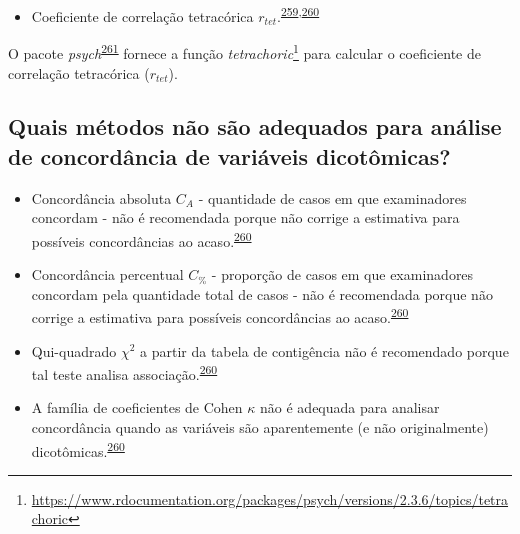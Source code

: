 \documentclass[
  a4paper,
]{book}
\providecommand{\tightlist}{%
  \setlength{\itemsep}{0pt}\setlength{\parskip}{0pt}}
\renewcommand{\href}[2]{#2\footnote{\url{#1}}}
\newenvironment{infobox}[1]
  {
  \begin{itemize}
  \renewcommand{\labelitemi}{
    \raisebox{-.7\height}[0pt][0pt]{
      {\setkeys{Gin}{width=3em,keepaspectratio}
        \texttt{[image: \#1]}}
    }
  }
  \setlength{\fboxsep}{1em}
  \begin{blackbox}
  \item
  }
  {
  \end{blackbox}
  \end{itemize}
  }
\begin{document}
\begin{itemize}
\tightlist
\item
  Coeficiente de correlação tetracórica \(r_{tet}\).\textsuperscript{\protect\hyperlink{ref-i.mathe1901}{259},\protect\hyperlink{ref-banerjee1999}{260}}
\end{itemize}

\begin{infobox}{images/Rlogo}
O pacote \emph{psych}\textsuperscript{\protect\hyperlink{ref-psych}{261}} fornece a função \href{https://www.rdocumentation.org/packages/psych/versions/2.3.6/topics/tetrachoric}{\emph{tetrachoric}} para calcular o coeficiente de correlação tetracórica (\(r_{tet}\)).

\end{infobox}

\hypertarget{quais-muxe9todos-nuxe3o-suxe3o-adequados-para-anuxe1lise-de-concorduxe2ncia-de-variuxe1veis-dicotuxf4micas}{%
\subsection{Quais métodos não são adequados para análise de concordância de variáveis dicotômicas?}\label{quais-muxe9todos-nuxe3o-suxe3o-adequados-para-anuxe1lise-de-concorduxe2ncia-de-variuxe1veis-dicotuxf4micas}}

\begin{itemize}
\item
  Concordância absoluta \(C_{A}\) - quantidade de casos em que examinadores concordam - não é recomendada porque não corrige a estimativa para possíveis concordâncias ao acaso.\textsuperscript{\protect\hyperlink{ref-banerjee1999}{260}}
\item
  Concordância percentual \(C_{\%}\) - proporção de casos em que examinadores concordam pela quantidade total de casos - não é recomendada porque não corrige a estimativa para possíveis concordâncias ao acaso.\textsuperscript{\protect\hyperlink{ref-banerjee1999}{260}}
\item
  Qui-quadrado \(\chi^2\) a partir da tabela de contigência não é recomendado porque tal teste analisa associação.\textsuperscript{\protect\hyperlink{ref-banerjee1999}{260}}
\item
  A família de coeficientes de Cohen \(\kappa\) não é adequada para analisar concordância quando as variáveis são aparentemente (e não originalmente) dicotômicas.\textsuperscript{\protect\hyperlink{ref-banerjee1999}{260}}
\end{itemize}
\end{document}
